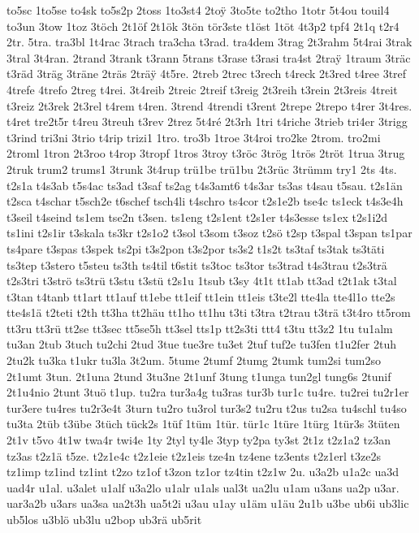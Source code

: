 {to5sc
1to5se
to4sk
to5s2p
2toss
1to3st4
2to^^ff
3to5te
to2tho
1totr
5t4ou
touil4
to3un
3tow
1toz
3töch
2t1öf
2t1ök
3tön
tör3ste
t1öst
1töt
4t3p2
tpf4
2t1q
t2r4
2tr.
5tra.
tra3bl
1t4rac
3trach
tra3cha
t3rad.
tra4dem
3trag
2t3rahm
5t4rai
3trak
3tral
3t4ran.
2trand
3trank
t3rann
5trans
t3rase
t3rasi
tra4st
2tra^^ff
1traum
3träc
t3räd
3träg
3träne
2träs
2trä^^ff
4t5re.
2treb
2trec
t3rech
t4reck
2t3red
t4ree
3tref
4trefe
4trefo
2treg
t4rei.
3t4reib
2treic
2treif
t3reig
2t3reih
t3rein
2t3reis
4treit
t3reiz
2t3rek
2t3rel
t4rem
t4ren.
3trend
4trendi
t3rent
2trepe
2trepo
t4rer
3t4res.
t4ret
tre2t5r
t4reu
3treuh
t3rev
2trez
5t4ré
2t3rh
1tri
t4riche
3trieb
tri4er
3trigg
t3rind
tri3ni
3trio
t4rip
trizi1
1tro.
tro3b
1troe
3t4roi
tro2ke
2trom.
tro2mi
2troml
1tron
2t3roo
t4rop
3tropf
1tros
3troy
t3röc
3trög
1trös
2tröt
1trua
3trug
2truk
trum2
trums1
3trunk
3t4rup
trü1be
trü1bu
2t3rüc
3trümm
try1
2ts
4ts.
t2s1a
t4s3ab
t5s4ac
ts3ad
t3saf
ts2ag
t4s3amt6
t4s3ar
ts3as
t4sau
t5sau.
t2s1än
t2sca
t4schar
t5sch2e
t6schef
tsch4li
t4schro
ts4cor
t2s1e2b
tse4c
ts1eck
t4s3e4h
t3seil
t4seind
ts1em
tse2n
t3sen.
ts1eng
t2s1ent
t2s1er
t4s3esse
ts1ex
t2s1i2d
ts1ini
t2s1ir
t3skala
ts3kr
t2s1o2
t3sol
t3som
t3soz
t2sö
t2sp
t3spal
t3span
ts1par
ts4pare
t3spas
t3spek
ts2pi
t3s2pon
t3s2por
ts3s2
t1s2t
ts3taf
ts3tak
ts3täti
ts3tep
t3stero
t5steu
ts3th
ts4til
t6stit
ts3toc
ts3tor
ts3trad
t4s3trau
t2s3trä
t2s3tri
t3strö
ts3trü
t3stu
t3stü
t2s1u
1tsub
t3sy
4t1t
tt1ab
tt3ad
t2t1ak
t3tal
t3tan
t4tanb
tt1art
tt1auf
tt1ebe
tt1eif
tt1ein
tt1eis
t3te2l
tte4la
tte4l1o
tte2s
tte4s1ä
t2teti
t2th
tt3ha
tt2häu
tt1ho
tt1hu
t3ti
t3tra
t2trau
t3trä
t3t4ro
tt5rom
tt3ru
tt3rü
tt2se
tt3sec
tt5se5h
tt3sel
tts1p
tt2s3ti
ttt4
t3tu
tt3z2
1tu
tu1alm
tu3an
2tub
3tuch
tu2chi
2tud
3tue
tue3re
tu3et
2tuf
tuf2e
tu3fen
t1u2fer
2tuh
2tu2k
tu3ka
t1ukr
tu3la
3t2um.
5tume
2tumf
2tumg
2tumk
tum2si
tum2so
2t1umt
3tun.
2t1una
2tund
3tu3ne
2t1unf
3tung
t1unga
tun2gl
tung6s
2tunif
2t1u4nio
2tunt
3tuö
t1up.
tu2ra
tur3a4g
tu3ras
tur3b
tur1c
tu4re.
tu2rei
tu2r1er
tur3ere
tu4res
tu2r3e4t
3turn
tu2ro
tu3rol
tur3s2
tu2ru
t2us
tu2sa
tu4schl
tu4so
tu3ta
2tüb
t3übe
3tüch
tück2s
1tüf
1tüm
1tür.
tür1c
1türe
1türg
1tür3s
3tüten
2t1v
t5vo
4t1w
twa4r
twi4e
1ty
2tyl
ty4le
3typ
ty2pa
ty3st
2t1z
t2z1a2
tz3an
tz3as
t2z1ä
t5ze.
t2z1e4c
t2z1eie
t2z1eis
tze4n
tz4ene
tz3ents
t2z1erl
t3ze2s
tz1imp
tz1ind
tz1int
t2zo
tz1of
t3zon
tz1or
tz4tin
t2z1w
2u.
u3a2b
u1a2c
ua3d
uad4r
u1al.
u3alet
u1alf
u3a2lo
u1alr
u1als
ual3t
ua2lu
u1am
u3ans
ua2p
u3ar.
uar3a2b
u3ars
ua3sa
ua2t3h
ua5t2i
u3au
u1ay
u1äm
u1äu
2u1b
u3be
ub6i
ub3lic
ub5los
u3blö
ub3lu
u2bop
ub3rä
ub5rit
}
